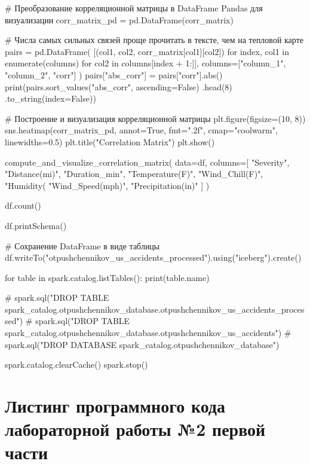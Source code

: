 \begin{code}
    # Преобразование корреляционной матрицы в DataFrame Pandas для визуализации
    corr_matrix_pd = pd.DataFrame(corr_matrix)

    # Числа самых сильных связей проще прочитать в тексте, чем на тепловой карте
    pairs = pd.DataFrame(
        [(col1, col2, corr_matrix[col1][col2])
         for index, col1 in enumerate(columns) for col2 in columns[index + 1:]],
        columns=["column_1", "column_2", "corr"]
    )
    pairs["abs_corr"] = pairs["corr"].abs()
    print(pairs.sort_values("abs_corr", ascending=False)
          .head(8)
          .to_string(index=False))

    # Построение и визуализация корреляционной матрицы
    plt.figure(figsize=(10, 8))
    sns.heatmap(corr_matrix_pd, annot=True, fmt=".2f", cmap="coolwarm", linewidths=0.5)
    plt.title("Correlation Matrix")
    plt.show()

compute_and_visualize_correlation_matrix(
    data=df, columns=[
        "Severity", "Distance(mi)", "Duration_min", "Temperature(F)",
        "Wind_Chill(F)", "Humidity(%
        "Wind_Speed(mph)", "Precipitation(in)"
    ]
)

df.count()

df.printSchema()

# Сохранение DataFrame в виде таблицы
df.writeTo("otpushchennikov_us_accidents_processed").using("iceberg").create()

for table in spark.catalog.listTables():
    print(table.name)

# spark.sql("DROP TABLE spark_catalog.otpushchennikov_database.otpushchennikov_us_accidents_processed")
# spark.sql("DROP TABLE spark_catalog.otpushchennikov_database.otpushchennikov_us_accidents")
# spark.sql("DROP DATABASE spark_catalog.otpushchennikov_database")

spark.catalog.clearCache()
spark.stop()

\end{code}

\chapter{Листинг программного кода лабораторной работы №2 первой части}\label{app:C}\vspace{\baselineskip}

